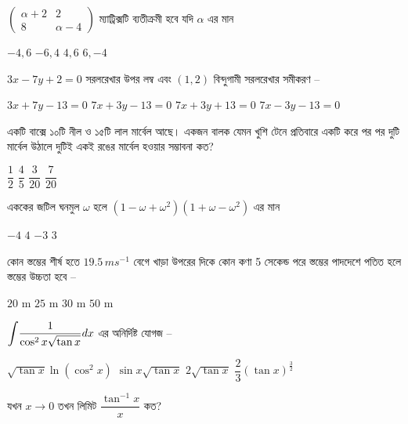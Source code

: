 \documentclass[addpoints]{exam}
\begin{document}
\begin{questions}
\question $ \begin{pmatrix}
\alpha +2 & 2\\
8 & \alpha -4
\end{pmatrix} $ ম্যাট্রিক্সটি ব্যতীক্রমী হবে যদি $ \alpha $ এর মান 

\begin{oneparchoices}
\choice $ -4, 6 $
\choice $-6, 4$
\choice $ 4, 6$
\choice $6, -4$
\end{oneparchoices}

\question $ 3x-7y+2=0 $ সরলরেখার উপর লম্ব এবং $ (1,2) $ বিন্দুগামী সরলরেখার সমীকরণ – 
 
\begin{oneparchoices}
\choice $ 3x+7y-13=0 $
\choice $ 7x+3y-13=0 $
\choice $ 7x+3y+13=0 $
\choice $ 7x-3y-13 = 0 $
\end{oneparchoices}

\question একটি বাক্সে ১০টি নীল ও ১৫টি লাল মার্বেল আছে। একজন বালক যেমন খুশি টেনে প্রতিবারে একটি করে পর পর দুটি মার্বেল উঠালে দুটিই একই রঙের মার্বেল হওয়ার সম্ভাবনা কত? 

\begin{oneparchoices}
\choice $ \dfrac{1}{2} $
\choice $ \dfrac{4}{5} $
\choice $ \dfrac{3}{20} $
\choice $ \dfrac{7}{20} $
\end{oneparchoices}

\question  এককের জটিল ঘনমুল $ \omega $ হলে $ (1-\omega +\omega^{2})(1+\omega -\omega^{2}) $ এর মান

\begin{oneparchoices}
\choice $ -4 $
\choice $ 4 $
\choice  $ -3 $
\choice $ 3 $
\end{oneparchoices}

 \question  কোন স্তম্ভের শীর্ষ হতে $ 19.5\,ms^{-1} $ বেগে খাড়া উপরের দিকে কোন কণা 5 সেকেন্ড পরে স্তম্ভের পাদদেশে পতিত হলে স্তম্ভের উচ্চতা হবে –

\begin{oneparchoices}
\choice $ 20 $ m
\choice $ 25 $ m
\choice $ 30 $ m
\choice $ 50 $ m
\end{oneparchoices}

\question  $ \mathlarger{\int}\dfrac{1}{\cos^{2}x\sqrt{\tan x}}dx $ এর অনির্দিষ্ট যোগজ – 

\begin{oneparchoices}
\choice $ \sqrt{\tan x}\ln (\cos^{2} x)  $
\choice $ \sin x\sqrt{\tan x}  $
\choice $ 2\sqrt{\tan x}  $
\choice $ \dfrac{2}{3}(\tan x)^{\frac{3}{2}} $
\end{oneparchoices}

\question  যখন $ x\to 0  $ তখন  লিমিট  $ \dfrac{\tan^{-1}x}{x} $ কত?


\end{questions}
\end{document}
